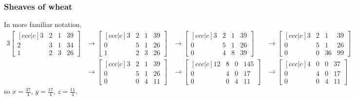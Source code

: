 \documentclass{beamer}
\theoremstyle{definition}
\begin{document}
\begin{frame}
    \frametitle{Sheaves of wheat}
    In more familiar notation,
    {\scriptsize
        \begin{alignat*}{3}
            \begin{bmatrix}[ccc|c]
                3 & 2 & 1 & 39 \\
                2 & 3 & 1 & 34 \\
                1 & 2 & 3 & 26
            \end{bmatrix} &\rightarrow
            \begin{bmatrix}[ccc|c]
                3 & 2 & 1 & 39 \\
                0 & 5 & 1 & 26 \\
                1 & 2 & 3 & 26
            \end{bmatrix} &\rightarrow
            \begin{bmatrix}[ccc|c]
                3 & 2 & 1 & 39 \\
                0 & 5 & 1 & 26 \\
                0 & 4 & 8 & 39
            \end{bmatrix} &\rightarrow
            \begin{bmatrix}[ccc|c]
                3 & 2 & 1  & 39 \\
                0 & 5 & 1  & 26 \\
                0 & 0 & 36 & 99
            \end{bmatrix} \\
            &\rightarrow
            \begin{bmatrix}[ccc|c]
                3 & 2 & 1 & 39 \\
                0 & 5 & 1 & 26 \\
                0 & 0 & 4 & 11
            \end{bmatrix} &\rightarrow
            \begin{bmatrix}[ccc|c]
                12 & 8 & 0 & 145 \\
                0  & 4 & 0 & 17 \\
                0  & 0 & 4 & 11
            \end{bmatrix} &\rightarrow
            \begin{bmatrix}[ccc|c]
                4 & 0 & 0 & 37 \\
                0 & 4 & 0 & 17 \\
                0 & 0 & 4 & 11
            \end{bmatrix}
        \end{alignat*}
        }
    so $x = \frac{37}{4}$, $y = \frac{17}{4}$, $z = \frac{11}{4}$.
\end{frame}
\end{document}
